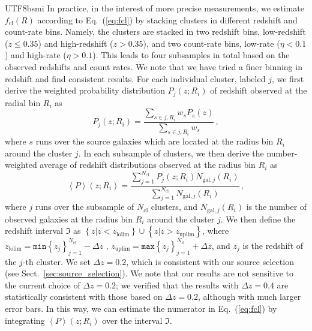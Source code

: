 \documentclass[longauth]{aa}
\newcommand{\redshift}{\ensuremath{z}}
\newcommand{\lensingw}{\ensuremath{w}}
\newcommand{\fcl}{\ensuremath{f_{\mathrm{cl}}}}
\newcommand{\rate}{\ensuremath{\eta}}
\begin{document}
\begin{CJK*}{UTF8}{bsmi}
In practice, in the interest of more precise measurements, we estimate $\fcl\left(R\right)$ according to Eq.~(\ref{eq:fcl}) by stacking clusters in different redshift and count-rate bins.
Namely, the clusters are stacked in two redshift bins, low-redshift ($\redshift \leq 0.35$) and high-redshift ($\redshift>0.35$), and two count-rate bins, low-rate ($\rate<0.1$) and high-rate ($\rate>0.1$).
This leads to four subsamples in total based on the observed redshifts and count rates.
We note that we have tried a finer binning in redshift and find consistent results.
For each individual cluster, labeled $j$, we first derive the weighted probability distribution $P_{j}\left(\redshift;R_{i}\right)$ of redshift observed at the radial bin $R_{i}$ as
%
\begin{equation}
\label{eq:wpz}
P_{j}
\left(\redshift;R_{i}\right)
 = 
\frac{
\sum\limits_{s\in j, R_{i} } {\lensingw}_{s} P_{s}(\redshift)
}{
\sum\limits_{s\in j, R_{i} } {\lensingw}_{s}
} \, ,
\end{equation}
%
where $s$ runs over the source galaxies which are located at the radius bin $R_{i}$ around the cluster $j$.
In each subsample of clusters, we then derive the number-weighted average of redshift distributions observed at the radius bin $R_{i}$ as
%
\begin{equation}
\label{eq:average_wpz}
\left\langle
P
\right\rangle
\left(\redshift;R_{i}\right)
 = 
\frac{
\sum\limits_{j=1}^{N_{\mathrm{cl}}} P_{j}\left(\redshift;R_{i}\right) N_{\mathrm{gal}, j}\left(R_{i}\right)
}{
\sum\limits_{j=1}^{N_{\mathrm{cl}}} N_{\mathrm{gal}, j}\left(R_{i}\right)
} \, ,
\end{equation}
%
where $j$ runs over the subsample of $N_{\mathrm{cl}}$ clusters, and $N_{\mathrm{gal}, j}\left(R_{i}\right)$ is the number of observed galaxies at the radius bin $R_{i}$ around the cluster $j$.
We then define the redshift interval $\mathfrak{I}$ as 
$
\left\lbrace \redshift|\redshift < {\redshift}_{\mathrm{lolim}}\right\rbrace
\cup
\left\lbrace \redshift|\redshift > {\redshift}_{\mathrm{uplim}}\right\rbrace
$, where 
$
{\redshift}_{\mathrm{lolim}} = \mathtt{min}\left\lbrace{\redshift}_{j}\right\rbrace_{j=1}^{N_{\mathrm{cl}}} - \Delta\redshift
$
,
$
{\redshift}_{\mathrm{uplim}} = \mathtt{max}\left\lbrace{\redshift}_{j}\right\rbrace_{j=1}^{N_{\mathrm{cl}}} + \Delta\redshift
$,  
and ${\redshift}_{j}$ is the redshift of the $j$-th cluster.
We set $\Delta\redshift=0.2$, which is consistent with our source selection (see Sect.~\ref{sec:source_selection}).
We note that our results are not sensitive to the current choice of $\Delta\redshift=0.2$; 
we verified that the results with $\Delta\redshift=0.4$ are statistically consistent with those based on $\Delta\redshift=0.2$, although with much larger error bars.
In this way, we can estimate the numerator in Eq.~(\ref{eq:fcl}) by integrating 
$\left\langle P \right\rangle\left(\redshift;R_{i}\right)$ over the interval $\mathfrak{I}$.



\end{CJK*}
\end{document}
